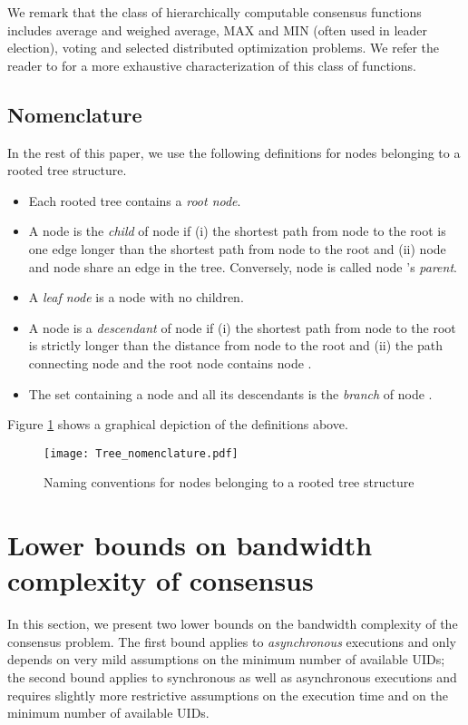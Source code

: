 \documentclass[letterpaper,10pt,conference]{ieeeconf}
\begin{document}
We remark that the class of hierarchically computable consensus functions includes average and weighed average, MAX and MIN (often used in leader election), voting and selected distributed optimization problems. We refer the reader to \cite{FR-MP:14a} for a more exhaustive characterization of this class of functions. 

\subsection{Nomenclature}
In the rest of this paper, we use the following definitions for nodes belonging to a rooted tree structure.
\begin{itemize}
\item Each rooted tree contains a \emph{root node}.
\item A node  is the \emph{child} of node  if (i) the shortest path from node  to the root is one edge longer than the shortest path from node  to the root and (ii) node  and node  share an edge in the tree. Conversely, node  is called node 's \emph{parent}.
\item A \emph{leaf node} is a node with no children.
\item A node  is a \emph{descendant} of node  if (i)  the shortest path from node  to the root is strictly longer than the distance from node  to the root and (ii) the path connecting node  and the root node contains node .
\item The set containing a node  and all its descendants is the \emph{branch} of node . 
\end{itemize}
Figure \ref{fig:treenomenclature} shows a graphical depiction of the definitions above.
\begin{figure}[h]
\centering
\texttt{[image: Tree\_nomenclature.pdf]}
\caption{Naming conventions for nodes belonging to a rooted tree structure}
\label{fig:treenomenclature}
\end{figure}

\section{Lower bounds on bandwidth complexity of consensus}
\label{sec:lbs}
In this section, we present two lower bounds on the bandwidth complexity of the consensus problem. The first bound applies to \emph{asynchronous} executions and only depends on very mild assumptions on the minimum number of available UIDs; the second bound applies to synchronous as well as asynchronous executions and requires slightly more restrictive assumptions on the execution time and on the minimum number of available UIDs. 
\end{document}
